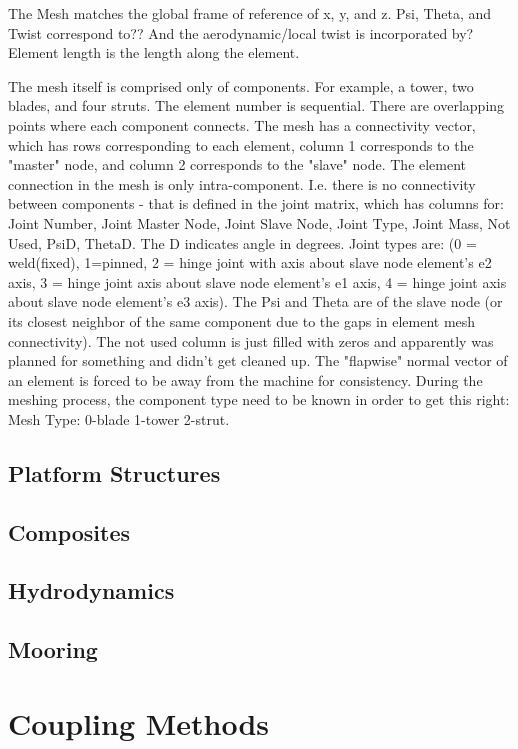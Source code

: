 \documentclass[11pt]{article}
\begin{document}
The Mesh matches the global frame of reference of x, y, and z.  Psi, Theta, and Twist correspond to??  And the aerodynamic/local twist is incorporated by?  Element length is the length along the element.

The mesh itself is comprised only of components.  For example, a tower, two blades, and four struts.  The element number is sequential. There are overlapping points where each component connects.  The mesh has a connectivity vector, which has rows corresponding to each element, column 1 corresponds to the "master" node, and column 2 corresponds to the "slave" node.  The element connection in the mesh is only intra-component.  I.e. there is no connectivity between components - that is defined in the joint matrix, which has columns for: Joint Number,   Joint Master Node, Joint Slave Node, Joint Type, Joint Mass, Not Used, PsiD, ThetaD.  The D indicates angle in degrees.  Joint types are: (0 = weld(fixed), 1=pinned, 2 = hinge joint with axis about slave node element’s e2 axis, 3 = hinge joint axis about slave node element’s e1 axis, 4 = hinge joint axis about slave node element’s e3 axis).  The Psi and Theta are of the slave node (or its closest neighbor of the same component due to the gaps in element mesh connectivity). The not used column is just filled with zeros and apparently was planned for something and didn't get cleaned up.  The "flapwise" normal vector of an element is forced to be away from the machine for consistency.  During the meshing process, the component type need to be known in order to get this right: Mesh Type: 0-blade 1-tower 2-strut.

\subsection{Platform Structures}
\subsection{Composites}
\subsection{Hydrodynamics}
\subsection{Mooring}

\section{Coupling Methods}
\end{document}
